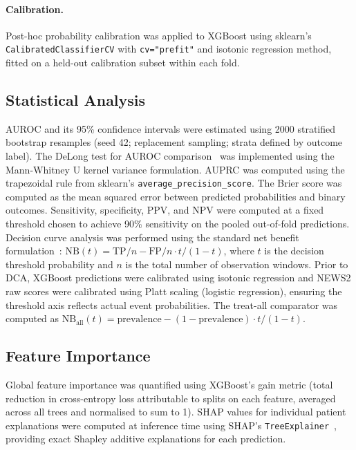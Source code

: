 \documentclass[12pt]{article}
\begin{document}
\paragraph{Calibration.}
Post-hoc probability calibration was applied to XGBoost using sklearn's
\texttt{CalibratedClassifierCV} with \texttt{cv="prefit"} and isotonic
regression method, fitted on a held-out calibration subset within each fold.

\subsection*{Statistical Analysis}

AUROC and its 95\% confidence intervals were estimated using 2000 stratified
bootstrap resamples (seed 42; replacement sampling; strata defined by outcome
label). The DeLong test for AUROC comparison~\cite{delong1988} was implemented
using the Mann-Whitney U kernel variance formulation. AUPRC was computed using
the trapezoidal rule from sklearn's \texttt{average\_precision\_score}. The
Brier score was computed as the mean squared error between predicted
probabilities and binary outcomes. Sensitivity, specificity, PPV, and NPV
were computed at a fixed threshold chosen to achieve 90\% sensitivity on the
pooled out-of-fold predictions. Decision curve analysis was performed using
the standard net benefit formulation~\cite{vickers2006dca}:
$\text{NB}(t) = \text{TP}/n - \text{FP}/n \cdot t/(1-t)$,
where $t$ is the decision threshold probability and $n$ is the total number
of observation windows. Prior to DCA, XGBoost predictions were calibrated
using isotonic regression and NEWS2 raw scores were calibrated using Platt
scaling (logistic regression), ensuring the threshold axis reflects actual
event probabilities. The treat-all comparator was computed as
$\text{NB}_{\text{all}}(t) = \text{prevalence} - (1-\text{prevalence}) \cdot t/(1-t)$.

\subsection*{Feature Importance}

Global feature importance was quantified using XGBoost's gain metric (total
reduction in cross-entropy loss attributable to splits on each feature,
averaged across all trees and normalised to sum to 1). SHAP values for
individual patient explanations were computed at inference time using SHAP's
\texttt{TreeExplainer}~\cite{lundberg2017}, providing exact Shapley additive
explanations for each prediction.
\end{document}

